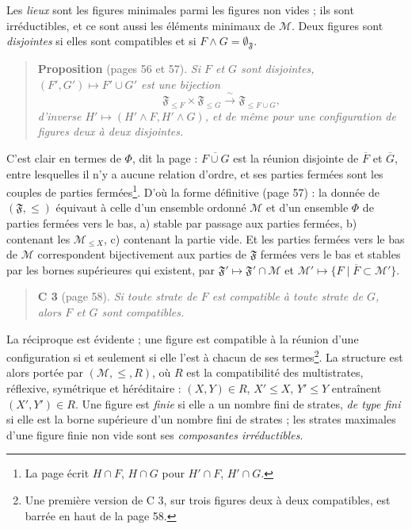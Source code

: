 \documentclass[11pt,a4paper]{article}
\begin{document}
Les \emph{lieux} sont les figures minimales parmi les figures non vides ; ils
sont irréductibles, et ce sont aussi les éléments minimaux de $\mathcal{M}$.
Deux figures sont \emph{disjointes} si elles sont compatibles et si $F \wedge G
= \emptyset_{\mathfrak{F}}$.

\begin{quote}
\textbf{Proposition} (pages 56 et 57). \emph{Si $F$ et $G$ sont disjointes,
$(F', G') \mapsto F' \cup G'$ est une bijection}
\[
\mathfrak{F}_{\leq F} \times \mathfrak{F}_{\leq G} \xrightarrow{\ \sim\ }
\mathfrak{F}_{\leq F \cup G},
\]
\emph{d'inverse $H' \mapsto (H' \wedge F, H' \wedge G)$, et de même pour une
configuration de figures deux à deux disjointes.}
\end{quote}

C'est clair en termes de $\Phi$, dit la page : $\overline{F \cup G}$ est la
réunion disjointe de $\overline{F}$ et $\overline{G}$, entre lesquelles il n'y
a aucune relation d'ordre, et ses parties fermées sont les couples de parties
fermées\footnote{La page écrit $H \cap F$, $H \cap G$ pour $H' \cap F$, $H' \cap
G$.}. D'où la forme définitive (page 57) : la donnée de $(\mathfrak{F}, \leq)$
équivaut à celle d'un ensemble ordonné $\mathcal{M}$ et d'un ensemble $\Phi$ de
parties fermées vers le bas, a) stable par passage aux parties fermées,
b) contenant les $\mathcal{M}_{\leq X}$, c) contenant la partie vide. Et les
parties fermées vers le bas de $\mathcal{M}$ correspondent bijectivement aux
parties de $\mathfrak{F}$ fermées vers le bas et stables par les bornes
supérieures qui existent, par $\mathfrak{F}' \mapsto \mathfrak{F}' \cap
\mathcal{M}$ et $\mathcal{M}' \mapsto \{F \mid \overline{F} \subset
\mathcal{M}'\}$.

\begin{quote}
\textbf{C 3} (page 58). \emph{Si toute strate de $F$ est compatible à toute
strate de $G$, alors $F$ et $G$ sont compatibles.}
\end{quote}

La réciproque est évidente ; une figure est compatible à la réunion d'une
configuration si et seulement si elle l'est à chacun de ses
termes\footnote{Une première version de C 3, sur trois figures deux à deux
compatibles, est barrée en haut de la page 58.}. La structure est alors portée
par $(\mathcal{M}, \leq, R)$, où $R$ est la compatibilité des multistrates,
réflexive, symétrique et héréditaire : $(X, Y) \in R$, $X' \leq X$, $Y' \leq Y$
entraînent $(X', Y') \in R$. Une figure est \emph{finie} si elle a un nombre
fini de strates, \emph{de type fini} si elle est la borne supérieure d'un nombre
fini de strates ; les strates maximales d'une figure finie non vide sont ses
\emph{composantes irréductibles}.
\end{document}
